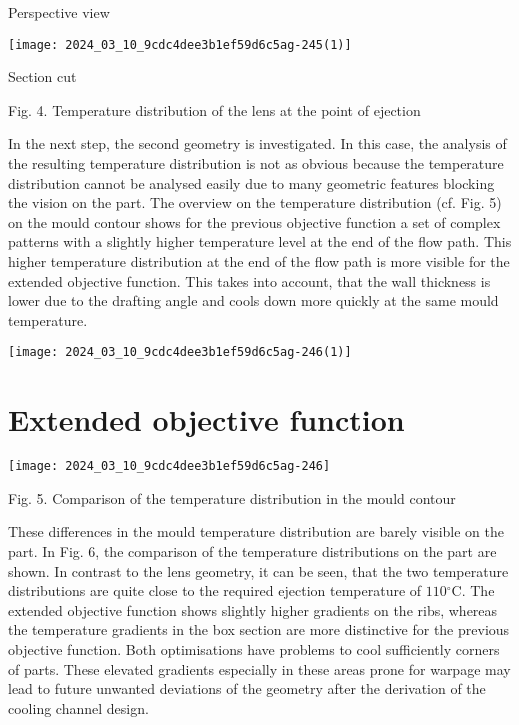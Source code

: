 \documentclass[10pt]{article}
\begin{document}
Perspective view

\begin{center}
\texttt{[image: 2024\_03\_10\_9cdc4dee3b1ef59d6c5ag-245(1)]}
\end{center}

Section cut

Fig. 4. Temperature distribution of the lens at the point of ejection

In the next step, the second geometry is investigated. In this case, the analysis of the resulting temperature distribution is not as obvious because the temperature distribution cannot be analysed easily due to many geometric features blocking the vision on the part. The overview on the temperature distribution (cf. Fig. 5) on the mould contour shows for the previous objective function a set of complex patterns with a slightly higher temperature level at the end of the flow path. This higher temperature distribution at the end of the flow path is more visible for the extended objective function. This takes into account, that the wall thickness is lower due to the drafting angle and cools down more quickly at the same mould temperature.

\begin{center}
\texttt{[image: 2024\_03\_10\_9cdc4dee3b1ef59d6c5ag-246(1)]}
\end{center}

\section*{Extended objective function}
\begin{center}
\texttt{[image: 2024\_03\_10\_9cdc4dee3b1ef59d6c5ag-246]}
\end{center}

Fig. 5. Comparison of the temperature distribution in the mould contour

These differences in the mould temperature distribution are barely visible on the part. In Fig. 6, the comparison of the temperature distributions on the part are shown. In contrast to the lens geometry, it can be seen, that the two temperature distributions are quite close to the required ejection temperature of $110{ }^{\circ} \mathrm{C}$. The extended objective function shows slightly higher gradients on the ribs, whereas the temperature gradients in the box section are more distinctive for the previous objective function. Both optimisations have problems to cool sufficiently corners of parts. These elevated gradients especially in these areas prone for warpage may lead to future unwanted deviations of the geometry after the derivation of the cooling channel design.
\end{document}
